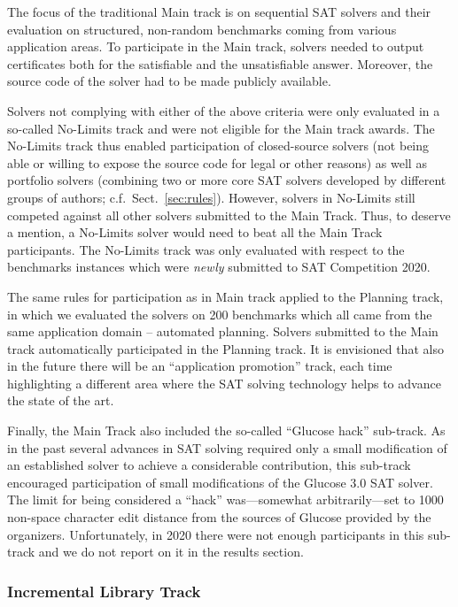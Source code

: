 \documentclass{elsarticle}
\begin{document}
The focus of the traditional Main track is on sequential SAT solvers and their evaluation on structured, non-random benchmarks coming from various application areas. To participate in the Main track, solvers needed to output certificates both for the satisfiable and the unsatisfiable answer. Moreover, the source code of the solver had to be made publicly available. 

Solvers not complying with either of the above criteria were only evaluated in a so-called No-Limits track and were not eligible for the Main track awards.
The No-Limits track thus enabled participation of closed-source solvers (not being able or willing to expose the source code for legal or other reasons) 
as well as portfolio solvers (combining two or more core SAT solvers developed by different groups of authors; c.f.~Sect.~\ref{sec:rules}).
However, solvers in No-Limits still competed against all other solvers submitted to the Main Track.
Thus, to deserve a mention, a No-Limits solver would need to beat all the Main Track participants.
The No-Limits track was only evaluated with respect to the benchmarks instances which were \emph{newly} submitted to SAT Competition 2020.

The same rules for participation as in Main track applied to the Planning track, in which we evaluated the solvers on 200 benchmarks 
which all came from the same application domain -- automated planning. 
Solvers submitted to the Main track automatically participated in the Planning track.
It is envisioned that also in the future there will be an ``application promotion'' track,
each time highlighting a different area where the SAT solving technology helps to advance the state of the art.

Finally, the Main Track also included the so-called ``Glucose hack'' sub-track. 
As in the past several advances in SAT solving required only a small modification of an established solver
to achieve a considerable contribution, this sub-track encouraged participation 
of small modifications of the Glucose 3.0 SAT solver. The limit for being considered a ``hack''
was---somewhat arbitrarily---set to 1000 non-space character edit distance from the sources of Glucose provided by the organizers. 
Unfortunately, in 2020 there were not enough participants in this sub-track and we do not report on it 
in the results section.

\subsubsection{Incremental Library Track}
\end{document}
